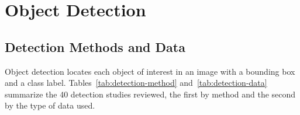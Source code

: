 \section{Object Detection}
\label{sec:lr-detection}

\subsection{Detection Methods and Data}

Object detection locates each object of interest in an image with a bounding box
and a class label. Tables~\ref{tab:detection-method} and~\ref{tab:detection-data}
summarize the 40 detection studies reviewed, the first by method and the second
by the type of data used.

